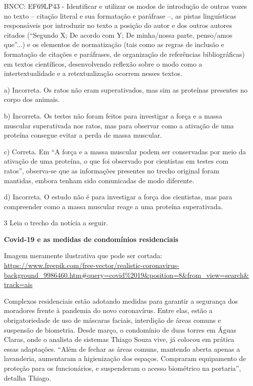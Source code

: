 \begin{itemize}
\begin{itemize}
{\begin{itemize}
BNCC: EF69LP43 - Identificar e utilizar os modos de introdução de outras
vozes no texto -- citação literal e sua formatação e paráfrase --, as
pistas linguísticas responsáveis por introduzir no texto a posição do
autor e dos outros autores citados (``Segundo X; De acordo com Y; De
minha/nossa parte, penso/amos que''...) e os elementos de normatização
(tais como as regras de inclusão e formatação de citações e paráfrases,
de organização de referências bibliográficas) em textos científicos,
desenvolvendo reflexão sobre o modo como a intertextualidade e a
retextualização ocorrem nesses textos.

a) Incorreta. Os ratos não eram superativados, mas sim as proteínas
presentes no corpo dos animais.

b) Incorreta. Os testes não foram feitos para investigar a força e a
massa muscular superativada nos ratos, mas para observar como a ativação
de uma proteína consegue evitar a perda de massa muscular.

c) Correta. Em ``A força e a massa muscular podem ser conservadas por
meio da ativação de uma proteína, o que foi observado por cientistas em
testes com ratos'', observa-se que as informações presentes no trecho
original foram mantidas, embora tenham sido comunicadas de modo
diferente.

d) Incorreta. O estudo não é para investigar a força dos cientistas, mas
para compreender como a massa muscular reage a uma proteína
superativada.

\num{3} Leia o trecho da notícia a seguir.

\textbf{Covid-19 e as medidas de condomínios residenciais}

Imagem meramente ilustrativa que pode ser cortada:
\url{https://www.freepik.com/free-vector/realistic-coronavirus-background_9986460.htm\#query=covid\%2019\&position=8\&from_view=search\&track=ais}

Complexos residenciais estão adotando medidas para garantir a segurança
dos moradores frente à pandemia do novo coronavírus. Entre elas, estão a
obrigatoriedade de uso de máscaras faciais, interdição de áreas comuns e
suspensão de biometria. Desde março, o condomínio de duas torres em
Águas Claras, onde o analista de sistemas Thiago Souza vive, já colocou
em prática essas adaptações. ``Além de fechar as áreas comuns, mantendo
aberta apenas a lavanderia, aumentaram a higienização dos espaços.
Compraram equipamento de proteção para os funcionários, e suspenderam o
acesso biométrico na portaria'', detalha Thiago.


\end{itemize}}
\end{itemize}
\end{itemize}

